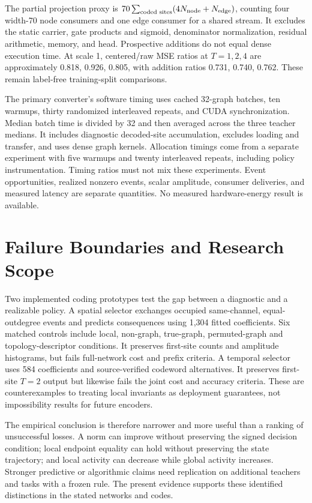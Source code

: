 \documentclass[10pt,twocolumn,letterpaper]{article}
\begin{document}
The partial projection proxy is $70\sum_{\text{coded sites}}(4N_{\rm node}+N_{\rm edge})$, counting four width-70 node consumers and one edge consumer for a shared stream. It excludes the static carrier, gate products and sigmoid, denominator normalization, residual arithmetic, memory, and head. Prospective additions do not equal dense execution time. At scale 1, centered/raw MSE ratios at $T=1,2,4$ are approximately 0.818, 0.926, 0.805, with addition ratios 0.731, 0.740, 0.762. These remain label-free training-split comparisons.

The primary converter's software timing uses cached 32-graph batches, ten warmups, thirty randomized interleaved repeats, and CUDA synchronization. Median batch time is divided by 32 and then averaged across the three teacher medians. It includes diagnostic decoded-site accumulation, excludes loading and transfer, and uses dense graph kernels. Allocation timings come from a separate experiment with five warmups and twenty interleaved repeats, including policy instrumentation. Timing ratios must not mix these experiments. Event opportunities, realized nonzero events, scalar amplitude, consumer deliveries, and measured latency are separate quantities. No measured hardware-energy result is available.

\section{Failure Boundaries and Research Scope}
Two implemented coding prototypes test the gap between a diagnostic and a realizable policy. A spatial selector exchanges occupied same-channel, equal-outdegree events and predicts consequences using 1,304 fitted coefficients. Six matched controls include local, non-graph, true-graph, permuted-graph and topology-descriptor conditions. It preserves first-site counts and amplitude histograms, but fails full-network cost and prefix criteria. A temporal selector uses 584 coefficients and source-verified codeword alternatives. It preserves first-site $T=2$ output but likewise fails the joint cost and accuracy criteria. These are counterexamples to treating local invariants as deployment guarantees, not impossibility results for future encoders.

The empirical conclusion is therefore narrower and more useful than a ranking of unsuccessful losses. A norm can improve without preserving the signed decision condition; local endpoint equality can hold without preserving the state trajectory; and local activity can decrease while global activity increases. Stronger predictive or algorithmic claims need replication on additional teachers and tasks with a frozen rule. The present evidence supports these identified distinctions in the stated networks and codes.
\end{document}
